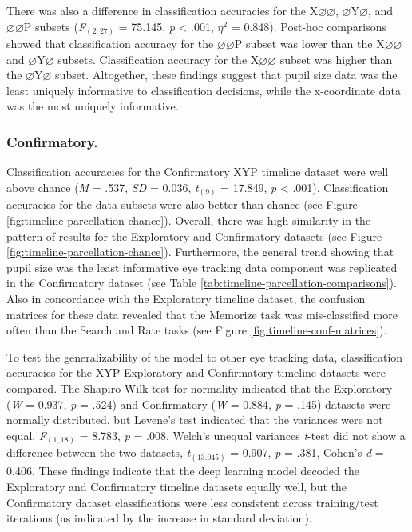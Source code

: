 \documentclass[
  english,
  man,floatsintext]{apa6}
\begin{document}
There was also a difference in classification accuracies for the X\(\varnothing\varnothing\), \(\varnothing\)Y\(\varnothing\), and \(\varnothing\varnothing\)P subsets (\emph{F}\(_{(2, 27)}\) = 75.145, \emph{p} \textless{} .001, \textit{$\eta$}\(^{2}\) = 0.848). Post-hoc comparisons showed that classification accuracy for the \(\varnothing\varnothing\)P subset was lower than the X\(\varnothing\varnothing\) and \(\varnothing\)Y\(\varnothing\) subsets. Classification accuracy for the X\(\varnothing\varnothing\) subset was higher than the \(\varnothing\)Y\(\varnothing\) subset. Altogether, these findings suggest that pupil size data was the least uniquely informative to classification decisions, while the x-coordinate data was the most uniquely informative.

\subsubsection{Confirmatory.}

Classification accuracies for the Confirmatory XYP timeline dataset were well above chance (\emph{M} = .537, \emph{SD} = 0.036, \emph{t}\(_{(9)}\) = 17.849, \emph{p} \textless{} .001). Classification accuracies for the data subsets were also better than chance (see Figure \ref{fig:timeline-parcellation-chance}). Overall, there was high similarity in the pattern of results for the Exploratory and Confirmatory datasets (see Figure \ref{fig:timeline-parcellation-chance}). Furthermore, the general trend showing that pupil size was the least informative eye tracking data component was replicated in the Confirmatory dataset (see Table \ref{tab:timeline-parcellation-comparisons}). Also in concordance with the Exploratory timeline dataset, the confusion matrices for these data revealed that the Memorize task was mis-classified more often than the Search and Rate tasks (see Figure \ref{fig:timeline-conf-matrices}).

To test the generalizability of the model to other eye tracking data, classification accuracies for the XYP Exploratory and Confirmatory timeline datasets were compared. The Shapiro-Wilk test for normality indicated that the Exploratory (\emph{W} = 0.937, \emph{p} = .524) and Confirmatory (\emph{W} = 0.884, \emph{p} = .145) datasets were normally distributed, but Levene's test indicated that the variances were not equal, \emph{F}\(_{(1, 18)}\) = 8.783, \emph{p} = .008. Welch's unequal variances \emph{t}-test did not show a difference between the two datasets, \emph{t}\(_{(13.045)}\) = 0.907, \emph{p} = .381, Cohen's \emph{d} = 0.406. These findings indicate that the deep learning model decoded the Exploratory and Confirmatory timeline datasets equally well, but the Confirmatory dataset classifications were less consistent across training/test iterations (as indicated by the increase in standard deviation).
\end{document}
